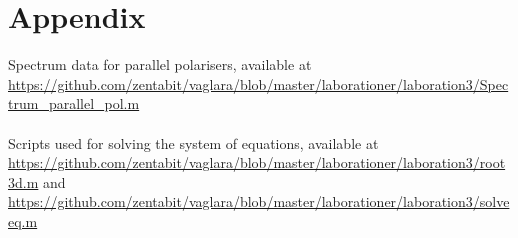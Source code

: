 \documentclass[a4paper]{article}
\begin{document}
\section{Appendix}
Spectrum data for parallel polarisers, available at \url{https://github.com/zentabit/vaglara/blob/master/laborationer/laboration3/Spectrum_parallel_pol.m} \\ \\
Scripts used for solving the system of equations, available at \url{https://github.com/zentabit/vaglara/blob/master/laborationer/laboration3/root3d.m} and 
\url{https://github.com/zentabit/vaglara/blob/master/laborationer/laboration3/solveeq.m}
\end{document}
